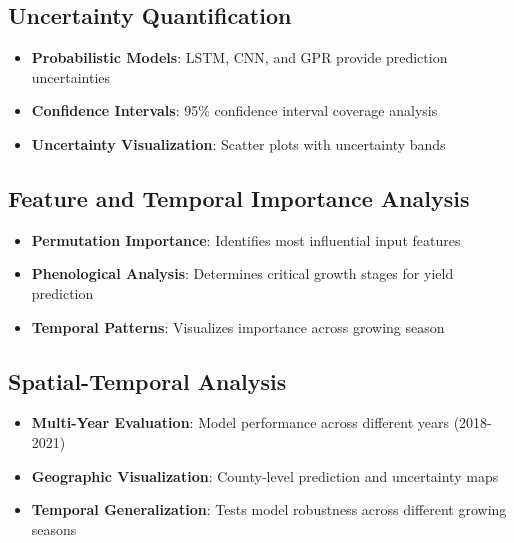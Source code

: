 \documentclass[
  letterpaper,
  DIV=11,
  numbers=noendperiod]{scrreprt}
\providecommand{\tightlist}{%
  \setlength{\itemsep}{0pt}\setlength{\parskip}{0pt}}\usepackage{longtable,booktabs,array}
\begin{document}
\subsection{Uncertainty
Quantification}\label{uncertainty-quantification}

\begin{itemize}
\tightlist
\item
  \textbf{Probabilistic Models}: LSTM, CNN, and GPR provide prediction
  uncertainties
\item
  \textbf{Confidence Intervals}: 95\% confidence interval coverage
  analysis
\item
  \textbf{Uncertainty Visualization}: Scatter plots with uncertainty
  bands
\end{itemize}

\subsection{Feature and Temporal Importance
Analysis}\label{feature-and-temporal-importance-analysis}

\begin{itemize}
\tightlist
\item
  \textbf{Permutation Importance}: Identifies most influential input
  features
\item
  \textbf{Phenological Analysis}: Determines critical growth stages for
  yield prediction
\item
  \textbf{Temporal Patterns}: Visualizes importance across growing
  season
\end{itemize}

\subsection{Spatial-Temporal Analysis}\label{spatial-temporal-analysis}

\begin{itemize}
\tightlist
\item
  \textbf{Multi-Year Evaluation}: Model performance across different
  years (2018-2021)
\item
  \textbf{Geographic Visualization}: County-level prediction and
  uncertainty maps
\item
  \textbf{Temporal Generalization}: Tests model robustness across
  different growing seasons
\end{itemize}
\end{document}
